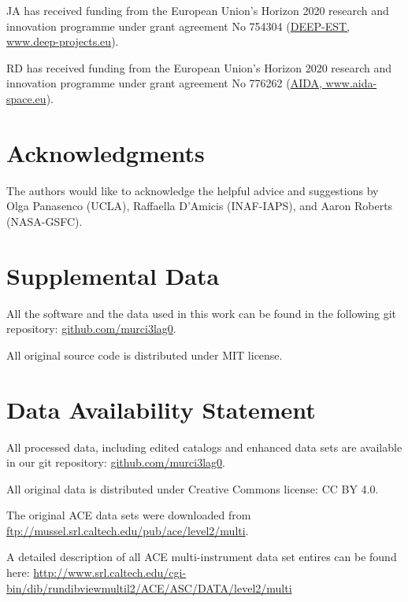 \documentclass[utf8]{frontiersSCNS} %
\begin{document}
JA has received funding from the European Union’s Horizon 2020 research and innovation programme under grant agreement No 754304 (\href{https://www.deep-projects.eu}{DEEP-EST, www.deep-projects.eu}).

RD has received funding from the European Union’s Horizon 2020 research and innovation programme under grant agreement No 776262 (\href{https://www.aida-space.eu}{AIDA, www.aida-space.eu}).

\section*{Acknowledgments}

The authors would like to acknowledge the helpful advice and suggestions by Olga Panasenco (UCLA), Raffaella D'Amicis (INAF-IAPS), and Aaron Roberts (NASA-GSFC).

\section*{Supplemental Data}

All the software and the data used in this work can be found in the following git repository: \href{http://github.com/murci3lag0}{github.com/murci3lag0}.

All original source code is distributed under MIT license.

\section*{Data Availability Statement}
\label{sec:repos}

All processed data, including edited catalogs and enhanced data sets are available in our git repository: \href{http://github.com/murci3lag0}{github.com/murci3lag0}.

All original data is distributed under Creative Commons license: CC BY 4.0.

The original ACE data sets were downloaded from \href{ftp://mussel.srl.caltech.edu/pub/ace/level2/multi}{ftp://mussel.srl.caltech.edu/pub/ace/level2/multi}.

A detailed description of all ACE multi-instrument data set entires can be found here: \href{http://www.srl.caltech.edu/cgi-bin/dib/rundibviewmultil2/ACE/ASC/DATA/level2/multi}{http://www.srl.caltech.edu/cgi-bin/dib/rundibviewmultil2/ACE/ASC/DATA/level2/multi}

\end{document}
